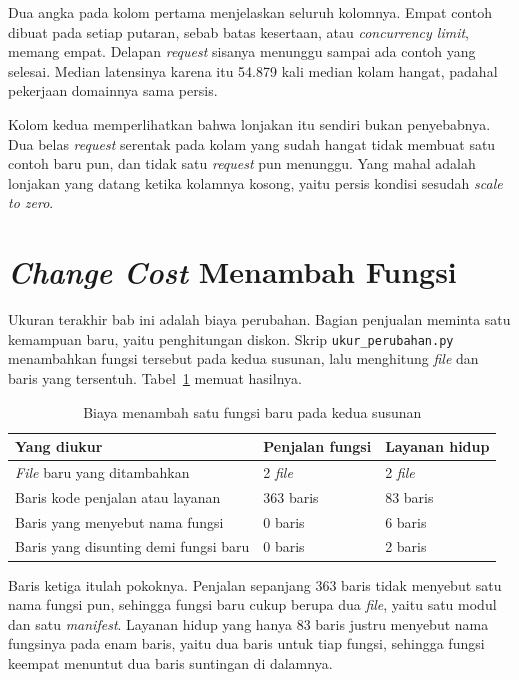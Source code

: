 Dua angka pada kolom pertama menjelaskan seluruh kolomnya. Empat contoh dibuat
pada setiap putaran, sebab batas kesertaan, atau \textit{concurrency
limit},
memang empat. Delapan \textit{request} sisanya menunggu sampai ada contoh yang
selesai. Median latensinya karena itu 54.879 kali median kolam hangat, padahal
pekerjaan domainnya sama persis.

Kolom kedua memperlihatkan bahwa lonjakan itu sendiri bukan penyebabnya. Dua
belas \textit{request} serentak pada kolam yang sudah hangat tidak membuat satu
contoh baru pun, dan tidak satu \textit{request} pun menunggu. Yang mahal adalah
lonjakan yang datang ketika kolamnya kosong, yaitu persis kondisi sesudah
\textit{scale to zero}.

\section{\textit{Change Cost} Menambah Fungsi}

Ukuran terakhir bab ini adalah biaya perubahan. Bagian penjualan meminta satu
kemampuan baru, yaitu penghitungan diskon. Skrip \texttt{ukur\_perubahan.py}
menambahkan fungsi tersebut pada kedua susunan, lalu menghitung \textit{file} dan
baris yang tersentuh. Tabel~\ref{tab:ubah-serverless} memuat hasilnya.

\begin{table}[htbp]
  \centering
  \caption{Biaya menambah satu fungsi baru pada kedua susunan}
  \label{tab:ubah-serverless}
  \begin{tabularx}{\textwidth}{|X|l|l|}
    \hline
    \textbf{Yang diukur} & \textbf{Penjalan fungsi} & \textbf{Layanan hidup} \\
    \hline
    \textit{File} baru yang ditambahkan & 2 \textit{file} & 2 \textit{file} \\
    \hline
    Baris kode penjalan atau layanan & 363 baris & 83 baris \\
    \hline
    Baris yang menyebut nama fungsi & 0 baris & 6 baris \\
    \hline
    Baris yang disunting demi fungsi baru & 0 baris & 2 baris \\
    \hline
  \end{tabularx}
\end{table}

Baris ketiga itulah pokoknya. Penjalan sepanjang 363 baris tidak menyebut satu
nama fungsi pun, sehingga fungsi baru cukup berupa dua \textit{file}, yaitu satu modul
dan satu \textit{manifest}. Layanan hidup yang hanya 83 baris justru menyebut nama
fungsinya pada enam baris, yaitu dua baris untuk tiap fungsi, sehingga fungsi
keempat menuntut dua baris suntingan di dalamnya.

